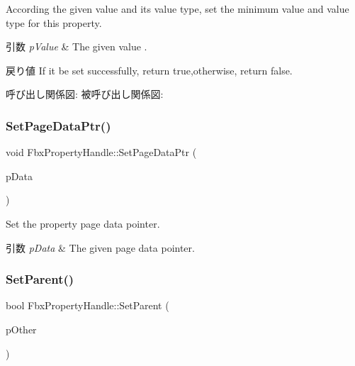 According the given value and its value type, set the minimum value and value type for this property. 
\begin{DoxyParams}{引数}
{\em p\+Value} & The given value . \\
\hline
\end{DoxyParams}
\begin{DoxyReturn}{戻り値}
If it be set successfully, return true,otherwise, return false. 
\end{DoxyReturn}
呼び出し関係図\+:
被呼び出し関係図\+:
\mbox{\label{class_fbx_property_handle_ac980bb1090ea5fd32c9587e3f0b9ac9b}} 
\subsubsection{\texorpdfstring{Set\+Page\+Data\+Ptr()}{SetPageDataPtr()}}
{\footnotesize\ttfamily void Fbx\+Property\+Handle\+::\+Set\+Page\+Data\+Ptr (\begin{DoxyParamCaption}\item[{void $\ast$}]{p\+Data }\end{DoxyParamCaption})}

Set the property page data pointer. 
\begin{DoxyParams}{引数}
{\em p\+Data} & The given page data pointer. \\
\hline
\end{DoxyParams}
\mbox{\label{class_fbx_property_handle_a4ce451166cd44ea838b4e4f1b5a8e8ad}} 
\subsubsection{\texorpdfstring{Set\+Parent()}{SetParent()}}
{\footnotesize\ttfamily bool Fbx\+Property\+Handle\+::\+Set\+Parent (\begin{DoxyParamCaption}\item[{const \hyperlink{class_fbx_property_handle}{Fbx\+Property\+Handle} \&}]{p\+Other }\end{DoxyParamCaption})}

